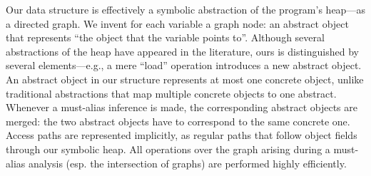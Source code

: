 




Our data structure is effectively a symbolic abstraction of the
program's heap---as a directed graph. We invent for each variable a
graph node: an abstract object that represents ``the object that the
variable points to''.  Although several abstractions of the heap have
appeared in the literature, ours is distinguished by several
elements---e.g., a mere ``load'' operation introduces a new abstract
object. An abstract object in our structure represents at most one
concrete object, unlike traditional abstractions that map multiple
concrete objects to one abstract. Whenever a must-alias inference is
made, the corresponding abstract objects are merged: the two abstract
objects have to correspond to the same concrete one. Access paths are
represented implicitly, as regular paths that follow object fields
through our symbolic heap. All operations over the graph arising
during a must-alias analysis (esp. the intersection of graphs) are
performed highly efficiently.

